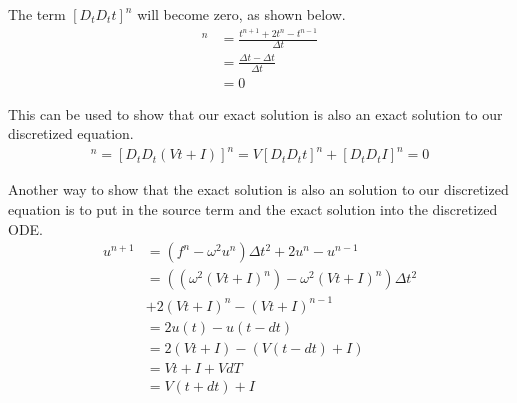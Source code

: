 \documentclass[10pt]{article}
\begin{document}
\begin{enumerate}[label=(\alph*)]
The term $[D_tD_t t]^n$ will become zero, as shown below.
\begin{align}
  [D_tD_t t]^n &= \frac{t^{n+1}+2t^n-t^{n-1}}{\Delta t}\\
  &= \frac{\Delta t - \Delta t}{\Delta t} \\
  &= 0
\end{align}

This can be used to show that our exact solution is also an exact solution to
our discretized equation.
\begin{align}
[D_tD_t u_e]^n= [D_tD_t (Vt + I)]^n = V[D_tD_t t]^n + [D_tD_t I ]^n = 0
\end{align}

Another way to show that the exact solution is also an solution to our discretized equation is to put in the source term and the exact solution into the discretized ODE.
\begin{align}
  u^{n+1} &= (f^n - \omega^2u^n)\Delta t^2 + 2u^n - u^{n-1}\\
  &=((\omega^2(Vt+I)^n)-\omega^2(Vt+I)^n)\Delta t^2\\ &+2(Vt+I)^n - (Vt + I)^{n-1}\\
  &= 2 u(t) - u(t-dt)\\
  &= 2(Vt + I) - (V(t-dt)+I)\\
  &= Vt+I+VdT\\
  &=V(t+dt)+I
\end{align}






\end{enumerate}
\end{document}
